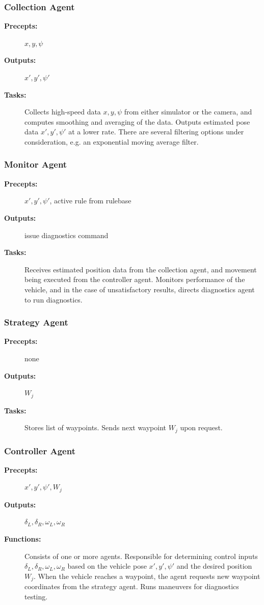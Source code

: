 \subsubsection{Collection Agent}
\begin{description}
\item[\textbf{Precepts:}] \qquad $x, y, \psi$
\item[\textbf{Outputs:}] \qquad $x', y', \psi'$
\item[\textbf{Tasks:}] \qquad Collects high-speed data $x, y, \psi$ from either simulator or the camera, and computes smoothing and averaging of the data. Outputs estimated pose data $x', y', \psi'$ at a lower rate. There are several filtering options under consideration, e.g. an exponential moving average filter.
\end{description}

\subsubsection{Monitor Agent}
\begin{description}
\item[\textbf{Precepts:}] \qquad $x', y', \psi'$, active rule from rulebase
\item[\textbf{Outputs:}] \qquad issue diagnostics command
\item[\textbf{Tasks:}] \qquad Receives estimated position data from the collection agent, and movement being executed from the controller agent. Monitors performance of the vehicle, and in the case of unsatisfactory results, directs diagnostics agent to run diagnostics.
\end{description}

\subsubsection{Strategy Agent}
\begin{description}
\item[\textbf{Precepts:}] \qquad none
\item[\textbf{Outputs:}] \qquad $W_j$
\item[\textbf{Tasks:}] \qquad Stores list of waypoints. Sends next waypoint $W_j$ upon request.
\end{description}

\subsubsection{Controller Agent}
\begin{description}
\item[\textbf{Precepts:}] \qquad $x', y', \psi', W_j$
\item[\textbf{Outputs:}] \qquad $\delta_L, \delta_R, \omega_L, \omega_R$
\item[\textbf{Functions:}] \qquad Consists of one or more agents. Responsible for determining control inputs $\delta_L, \delta_R, \omega_L, \omega_R$ based on the vehicle pose $x', y', \psi'$ and the desired position $W_j$. When the vehicle reaches a waypoint, the agent requests new waypoint coordinates from the strategy agent. Runs maneuvers for diagnostics testing.
\end{description}

